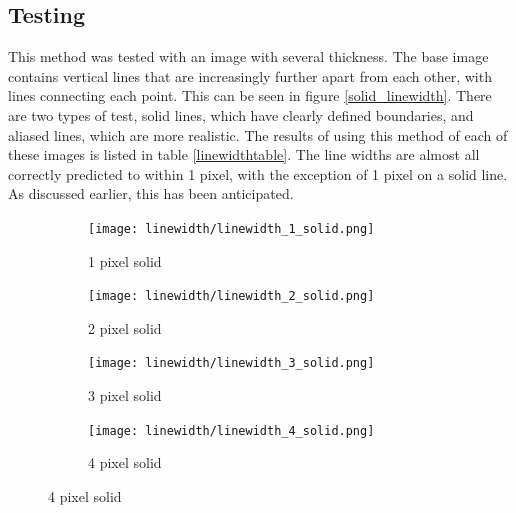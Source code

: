 \documentclass[../main.tex]{subfiles}
\begin{document}
    \subsection{Testing}
      This method was tested with an image with several thickness.
      The base image contains vertical lines that are increasingly further apart from each other, with lines connecting each point.
      This can be seen in figure \ref{solid_linewidth}.
      There are two types of test, solid lines, which have clearly defined boundaries, and aliased lines, which are more realistic.
      The results of using this method of each of these images is listed in table \ref{linewidthtable}.
      The line widths are almost all correctly predicted to within 1 pixel, with the exception of 1 pixel on a solid line.
      As discussed earlier, this has been anticipated.
    \begin{figure}[H]
      \centering
      \begin{subfigure}[B]{0.19\textwidth}
        \centering
        \texttt{[image: linewidth/linewidth\_1\_solid.png]}
        \caption{1 pixel solid}
      \end{subfigure}
      \begin{subfigure}[B]{0.19\textwidth}
        \centering
        \texttt{[image: linewidth/linewidth\_2\_solid.png]}
        \caption{2 pixel solid}
      \end{subfigure}
       \begin{subfigure}[B]{0.19\textwidth}
        \centering
        \texttt{[image: linewidth/linewidth\_3\_solid.png]}
        \caption{3 pixel solid}
      \end{subfigure}
     \begin{subfigure}[B]{0.19\textwidth}
        \centering
        \texttt{[image: linewidth/linewidth\_4\_solid.png]}
        \caption{4 pixel solid}
      \end{subfigure}


\end{figure}
\end{document}
